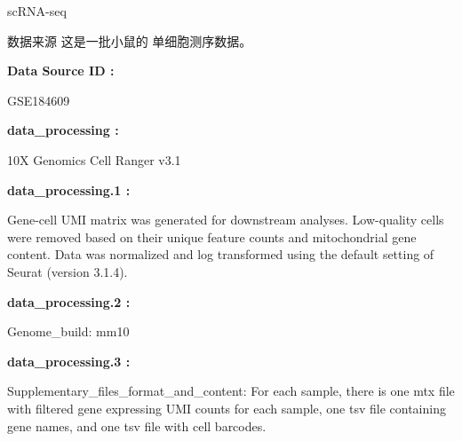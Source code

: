 \documentclass[
  ignorenonframetext,
]{beamer}
\begin{document}
\begin{frame}[fragile]{scRNA-seq}
\protect\hypertarget{scrna-seq}{}
\begin{block}{数据来源}
\protect\hypertarget{ux6570ux636eux6765ux6e90}{}
这是一批小鼠的 单细胞测序数据。

\begin{center}\begin{tcolorbox}[colback=gray!10, colframe=gray!50, width=0.9\linewidth, arc=1mm, boxrule=0.5pt]
\textbf{
Data Source ID
:}

\vspace{0.5em}

    GSE184609

\vspace{2em}


\textbf{
data\_processing
:}

\vspace{0.5em}

    10X Genomics Cell Ranger v3.1

\vspace{2em}


\textbf{
data\_processing.1
:}

\vspace{0.5em}

    Gene-cell UMI matrix was generated for downstream
analyses. Low-quality cells were removed based on their
unique feature counts and mitochondrial gene content. Data
was normalized and log transformed using the default
setting of Seurat (version 3.1.4).

\vspace{2em}


\textbf{
data\_processing.2
:}

\vspace{0.5em}

    Genome\_build: mm10

\vspace{2em}


\textbf{
data\_processing.3
:}

\vspace{0.5em}

    Supplementary\_files\_format\_and\_content: For each
sample, there is one mtx file with filtered gene expressing
UMI counts for each sample, one tsv file containing gene
names, and one tsv file with cell barcodes.

\vspace{2em}
\end{tcolorbox}
\end{center}


\end{block}
\end{frame}
\end{document}
